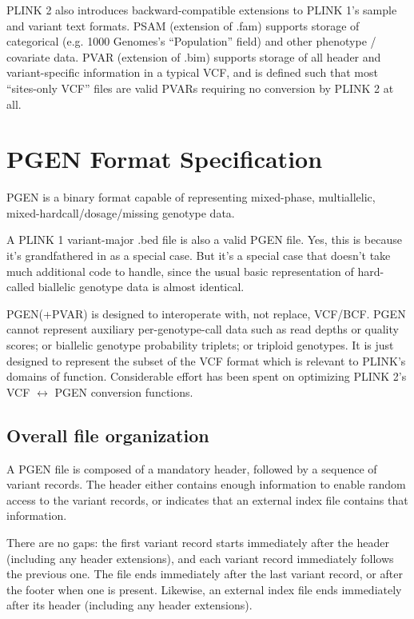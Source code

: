 \documentclass[8pt]{article}
\begin{document}
PLINK 2 also introduces backward-compatible extensions to PLINK 1's sample and
variant text formats.  PSAM (extension of .fam) supports storage of categorical
(e.g. 1000 Genomes's ``Population'' field) and other phenotype / covariate
data.  PVAR (extension of .bim) supports storage of all header and
variant-specific information in a typical VCF, and is defined such that most
``sites-only VCF'' files are valid PVARs requiring no conversion by PLINK 2 at
all.

\newpage
\section{PGEN Format Specification}

PGEN is a binary format capable of representing mixed-phase, multiallelic,
mixed-hardcall/dosage/missing genotype data.

A PLINK 1 variant-major .bed file is also a valid PGEN file.  Yes, this is
because it's grandfathered in as a special case.  But it's a special case that
doesn't take much additional code to handle, since the usual basic
representation of hard-called biallelic genotype data is almost identical.

PGEN(+PVAR) is designed to interoperate with, not replace, VCF/BCF.  PGEN
cannot represent auxiliary per-genotype-call data such as read depths or
quality scores; or biallelic genotype probability triplets; or triploid
genotypes.  It is just designed to represent the subset of the VCF format which
is relevant to PLINK's domains of function.  Considerable effort has been spent
on optimizing PLINK 2's VCF $\leftrightarrow$ PGEN conversion functions.

\subsection{Overall file organization}

A PGEN file is composed of a mandatory header, followed by a sequence of
variant records.  The header either contains enough information to enable
random access to the variant records, or indicates that an external index file
contains that information.

There are no gaps: the first variant record starts immediately after the
header (including any header extensions), and each variant record
immediately follows the previous one.  The file ends immediately after the
last variant record, or after the footer when one is present.  Likewise, an
external index file ends immediately after its header (including any header
extensions).
\end{document}
